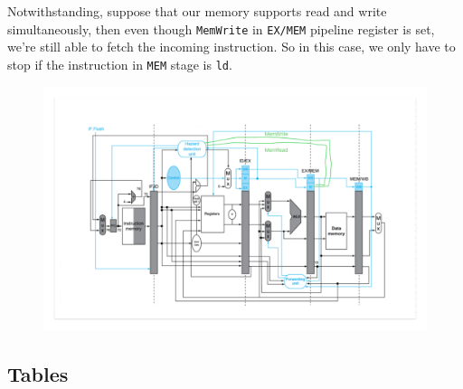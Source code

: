 \documentclass[12pt, a4paper]{article}
\begin{document}
Notwithstanding, suppose that our memory supports read and write simultaneously, then even though \texttt{MemWrite} in \texttt{EX/MEM} pipeline register is set, we're still able to fetch the incoming instruction. So in this case, we only have to stop if the instruction in \texttt{MEM} stage is \texttt{ld}.

\begin{figure}[htbp]
\centering
\includegraphics[width=.89\linewidth]{struct_hazard}
\caption{}
\label{fig:struct}
\end{figure}

\subsection{Tables}
\end{document}
